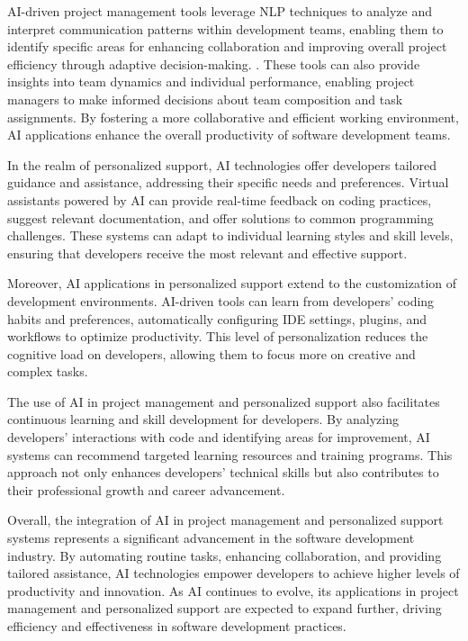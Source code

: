 AI-driven project management tools leverage NLP techniques to analyze and interpret communication patterns within development teams, enabling them to identify specific areas for enhancing collaboration and improving overall project efficiency through adaptive decision-making. \cite{pandy2024advancementsroboticsprocessautomation}. These tools can also provide insights into team dynamics and individual performance, enabling project managers to make informed decisions about team composition and task assignments. By fostering a more collaborative and efficient working environment, AI applications enhance the overall productivity of software development teams.



In the realm of personalized support, AI technologies offer developers tailored guidance and assistance, addressing their specific needs and preferences. Virtual assistants powered by AI can provide real-time feedback on coding practices, suggest relevant documentation, and offer solutions to common programming challenges. These systems can adapt to individual learning styles and skill levels, ensuring that developers receive the most relevant and effective support.



Moreover, AI applications in personalized support extend to the customization of development environments. AI-driven tools can learn from developers' coding habits and preferences, automatically configuring IDE settings, plugins, and workflows to optimize productivity. This level of personalization reduces the cognitive load on developers, allowing them to focus more on creative and complex tasks.



The use of AI in project management and personalized support also facilitates continuous learning and skill development for developers. By analyzing developers' interactions with code and identifying areas for improvement, AI systems can recommend targeted learning resources and training programs. This approach not only enhances developers' technical skills but also contributes to their professional growth and career advancement.



Overall, the integration of AI in project management and personalized support systems represents a significant advancement in the software development industry. By automating routine tasks, enhancing collaboration, and providing tailored assistance, AI technologies empower developers to achieve higher levels of productivity and innovation. As AI continues to evolve, its applications in project management and personalized support are expected to expand further, driving efficiency and effectiveness in software development practices.



